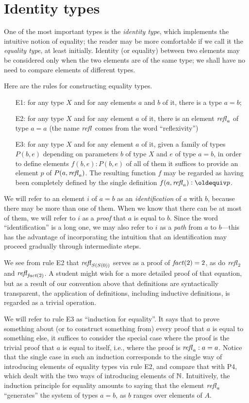 \section{Identity types}
\label{sec:identity-types}

One of the most important types is the \emph{identity type}, which implements the intuitive notion of equality; the reader may be more
comfortable if we call it the \emph{equality type}, at least initially.  Identity (or equality) between two elements may be considered only when
the two elements are of the same type; we shall have no need to compare elements of different types.

Here are the rules for constructing equality types.
\begin{enumerate}
\item[E1:]
  for any type $X$ and for any elements $a$ and $b$ of it, there is a type $a=b$;
\item[E2:] for any type $X$ and for any element $a$ of it, there is an element $\mathop{{\it refl}_{a}}$ of type $a=a$ (the name $\mathop{{\it refl}_{}}$ comes from the word
  ``reflexivity'')
\item[E3:] for any type $X$ and for any element $a$ of it, given a family of types $P(b,e)$ depending on parameters $b$ of type $X$ and $e$ of type
  $a=b$, in order to define elements $f(b,e) : P(b,e)$ of all of them it suffices to provide an element $p$ of $P(a,\mathop{{\it refl}_{a}})$.  The resulting
  function $f$ may be regarded as having been completely defined by the single definition $f(a,\refl a) \defeq p$.
\end{enumerate}

We will refer to an element $i$ of $a=b$ as an {\em identification} of $a$ with $b$, because there may be more than one of them.  When we know
that there can be at most of them, we will refer to $i$ as a {\em proof} that $a$ is equal to $b$.  Since the word ``identification'' is a long
one, we may also refer to $i$ as a {\em path} from $a$ to $b$---this has the advantage of incorporating the intuition that an
identification may proceed gradually through intermediate steps.

We see from rule E2 that $\mathop{{\it refl}_{S(S(0))}}$ serves as a proof of $\mathop{\mathit{fact}}(2)=2$, 
as do $\mathop{{\it refl}_{2}}$ and $\mathop{{\it refl}_{\mathop{\mathit{fact}}(2)}}$.  A student might wish for a
more detailed proof of that equation, but as a result of our convention above that definitions are syntactically transparent, the application of
definitions, including inductive definitions, is regarded as a trivial operation.

We will refer to rule E3 as ``induction for equality''.  It says that to prove something about (or to construct something from) every proof that
$a$ is equal to something else, it suffices to consider the special case where the proof is the trivial proof that $a$ is equal to itself, i.e.,
where the proof is $\mathop{{\it refl}_{a}} : a=a$.  Notice that the single case in such an induction corresponds to the single way of introducing elements of
equality types via rule E2, and compare that with P4, which dealt with the two ways of introducing elements of $\mathbb{N}$.
Intuitively, the induction principle for equality amounts to saying that the element $\mathop{{\it refl}_{a}}$ ``generates'' the system of types $a=b$, as $b$
ranges over elements of $A$.

